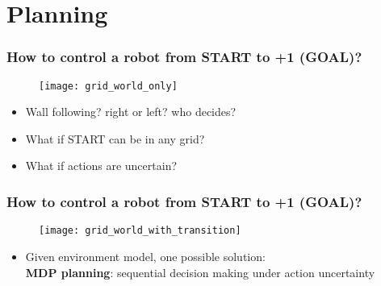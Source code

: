 \section{Planning}

\begin{frame}
\frametitle{How to control a robot from START to +1 (GOAL)?}
\begin{figure}
    \centering
    \texttt{[image: grid\_world\_only]}
\end{figure}
\pause

\begin{itemize}
  \item Wall following? right or left? who decides? \pause
  \item What if START can be in any grid? \pause
  \item What if actions are uncertain?
\end{itemize}
\end{frame}

\begin{frame}
\frametitle{How to control a robot from START to +1 (GOAL)?}
\begin{figure}
    \centering
    \texttt{[image: grid\_world\_with\_transition]}
\end{figure}
\pause

\begin{itemize}
  \item Given environment model, one possible solution: \\
  \textbf{MDP planning}: sequential decision making under action uncertainty
\end{itemize}
\end{frame}

